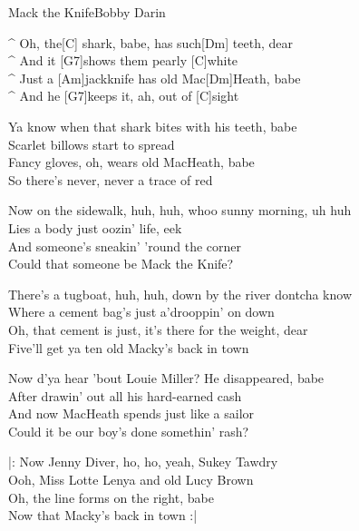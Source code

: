 \vspace{-0.3cm}
\begin{song}{Mack the Knife}{Bobby Darin}

\vspace{-0.2cm}
\begin{guitar}
^ Oh, the[C] shark, babe, has such[Dm] teeth, dear\\
^ And it [G7]shows them pearly [C]white\\
^ Just a [Am]jackknife has old Mac[Dm]Heath, babe\\
^ And he [G7]keeps it, ah, out of [C]sight\\
\end{guitar}

\begin{guitar}
Ya know when that shark bites with his teeth, babe\\
Scarlet billows start to spread\\
Fancy gloves, oh, wears old MacHeath, babe\\
So there's never, never a trace of red\\
\end{guitar}

\begin{guitar}
Now on the sidewalk, huh, huh, whoo sunny morning, uh huh\\
Lies a body just oozin' life, eek\\
And someone's sneakin' 'round the corner\\
Could that someone be Mack the Knife?\\
\end{guitar}

\begin{guitar}
There's a tugboat, huh, huh, down by the river dontcha know\\
Where a cement bag's just a'drooppin' on down\\
Oh, that cement is just, it's there for the weight, dear\\
Five'll get ya ten old Macky's back in town\\
\end{guitar}

\begin{guitar}
Now d'ya hear 'bout Louie Miller? He disappeared, babe\\
After drawin' out all his hard-earned cash\\
And now MacHeath spends just like a sailor\\
Could it be our boy's done somethin' rash?\\
\end{guitar}

\begin{guitar}
|: Now Jenny Diver, ho, ho, yeah, Sukey Tawdry \\
Ooh, Miss Lotte Lenya and old Lucy Brown\\
Oh, the line forms on the right, babe\\
Now that Macky's back in town :|\\
\end{guitar}

\end{song}
